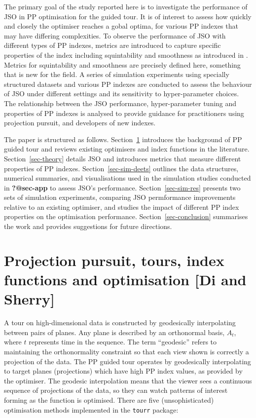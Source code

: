 \documentclass[
  number,
  preprint,
  3p]{elsarticle}
\begin{document}
The primary goal of the study reported here is to investigate the
performance of JSO in PP optimisation for the guided tour. It is of
interest to assess how quickly and closely the optimiser reaches a gobal
optima, for various PP indexes that may have differing complexities. To
observe the performance of JSO with different types of PP indexes,
metrics are introduced to capture specific properties of the index
including squintability and smoothness as introduced in
\citet{laa_using_2020}. Metrics for squintability and smoothness are
precisely defined here, something that is new for the field. A series of
simulation experiments using specially structured datasets and various
PP indexes are conducted to assess the behaviour of JSO under different
settings and its sensitivity to hyper-parameter choices. The
relationship between the JSO performance, hyper-parameter tuning and
properties of PP indexes is analysed to provide guidance for
practitioners using projection pursuit, and developers of new indexes.

The paper is structured as follows. Section~\ref{sec-background}
introduces the background of PP guided tour and reviews existing
optimisers and index functions in the literature.
Section~\ref{sec-theory} details JSO and introduces metrics that measure
different properties of PP indexes. Section~\ref{sec-sim-deets} outlines
the data structures, numerical summaries, and visualisations used in the
simulation studies conducted in \textbf{?@sec-app} to assess JSO's
performance. Section~\ref{sec-sim-res} presents two sets of simulation
experiments, comparing JSO permformance improvements relative to an
existing optimiser, and studies the impact of different PP index
properties on the optimisation performance. Section~\ref{sec-conclusion}
summarises the work and provides suggestions for future directions.

\section{Projection pursuit, tours, index functions and optimisation
{[}Di and Sherry{]}}\label{sec-background}

A tour on high-dimensional data is constructed by geodesically
interpolating between pairs of planes. Any plane is described by an
orthonormal basis, \(A_t\), where \(t\) represents time in the sequence.
The term ``geodesic'' refers to maintaining the orthonormality
constraint so that each view shown is correctly a projection of the
data. The PP guided tour operates by geodesically interpolating to
target planes (projections) which have high PP index values, as provided
by the optimiser. The geodesic interpolation means that the viewer sees
a continuous sequence of projections of the data, so they can watch
patterns of interest forming as the function is optimised. There are
five (unsophisticated) optimisation methods implemented in the
\texttt{tourr} package:
\end{document}
